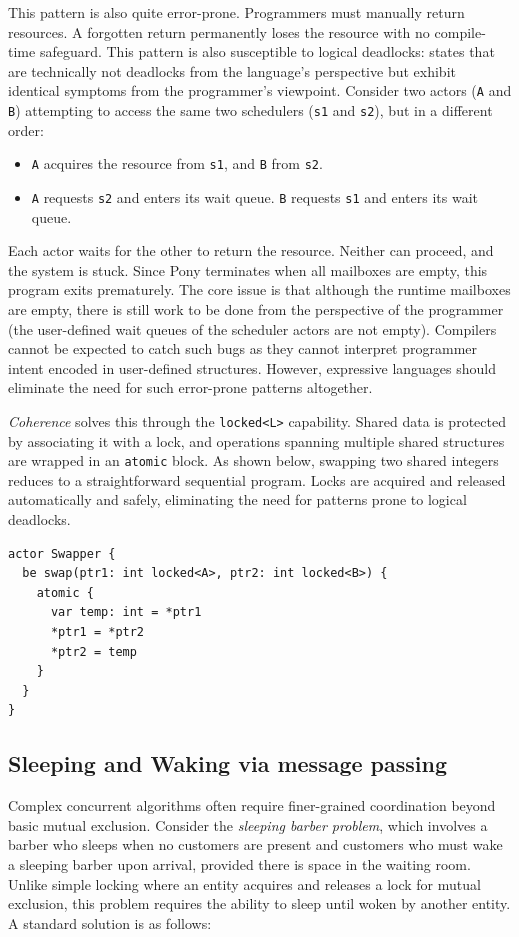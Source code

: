 This pattern is also quite error-prone. Programmers must manually return resources. A forgotten return permanently loses the resource with no compile-time safeguard. This pattern is also susceptible to logical deadlocks: states that are technically not deadlocks from the language's perspective but exhibit identical symptoms from the programmer's viewpoint. Consider two actors (\texttt{A} and \texttt{B}) attempting to access the same two schedulers (\texttt{s1} and \texttt{s2}), but in a different order:
\begin{itemize}
  \item \texttt{A} acquires the resource from \texttt{s1}, and \texttt{B} from \texttt{s2}.
  \item \texttt{A} requests \texttt{s2} and enters its wait queue. \texttt{B} requests \texttt{s1} and enters its wait queue.
\end{itemize}

Each actor waits for the other to return the resource. Neither can proceed, and the system is stuck. Since Pony terminates when all mailboxes are empty, this program exits prematurely. The core issue is that although the runtime mailboxes are empty, there is still work to be done from the perspective of the programmer (the user-defined wait queues of the scheduler actors are not empty). Compilers cannot be expected to catch such bugs as they cannot interpret programmer intent encoded in user-defined structures. However, expressive languages should eliminate the need for such error-prone patterns altogether.

\textit{Coherence} solves this through the \texttt{locked<L>} capability. Shared data is protected by associating it with a lock, and operations spanning multiple shared structures are wrapped in an \texttt{atomic} block. As shown below, swapping two shared integers reduces to a straightforward sequential program. Locks are acquired and released automatically and safely, eliminating the need for patterns prone to logical deadlocks.

\begin{verbatim}
actor Swapper {
  be swap(ptr1: int locked<A>, ptr2: int locked<B>) {
    atomic {
      var temp: int = *ptr1
      *ptr1 = *ptr2
      *ptr2 = temp
    }
  }
}
\end{verbatim}



\subsection{Sleeping and Waking via message passing}
Complex concurrent algorithms often require finer-grained coordination beyond basic mutual exclusion. Consider the \textit{sleeping barber problem}\cite{sleeping_barber}, which involves a barber who sleeps when no customers are present and customers who must wake a sleeping barber upon arrival, provided there is space in the waiting room. Unlike simple locking where an entity acquires and releases a lock for mutual exclusion, this problem requires the ability to sleep until woken by another entity. A standard solution is as follows:

